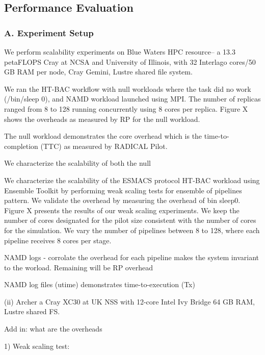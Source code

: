 \subsection{Performance Evaluation}

\subsubsection{A. Experiment Setup}



We perform scalability experiments on Blue Waters HPC resource-- a 13.3 petaFLOPS Cray at NCSA and University of Illinois, with 32 Interlago cores/50 GB RAM per node, Cray Gemini, Lustre shared file system. 

We ran the HT-BAC workflow with null workloads where the task did no work (/bin/sleep 0), and NAMD workload launched using MPI. The number of replicas ranged from 8 to 128 running concurrently using 8 cores per replica. Figure X shows the overheads as measured by RP for the null workload. 

The null workload demonstrates the core overhead which is the time-to-completion (TTC) as measured by RADICAL Pilot. 

We characterize the scalability of both the null 

We characterize the scalability of the ESMACS protocol HT-BAC workload using Ensemble Toolkit by performing weak scaling tests for ensemble of pipelines pattern. We validate the overhead by measuring the overhead of bin sleep0. Figure X presents the results of our weak scaling experiments. We keep the number of cores designated for the pilot size consistent with the number of cores for the simulation. We vary the number of pipelines between 8 to 128, where each pipeline receives 8 cores per stage. 

NAMD logs - corrolate the overhead for each pipeline makes the system invariant to the worload. Remaining will be RP overhead 


NAMD log files (utime) demonstrates time-to-execution (Tx) 




(ii) Archer a Cray XC30 at UK NSS with 12-core Intel Ivy Bridge 64 GB RAM, Lustre shared FS. 

Add in: what are the overheads



1) Weak scaling test: 

